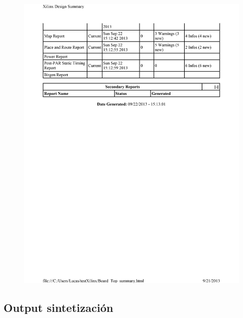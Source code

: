 \documentclass{article}
\begin{document}
\begin{figure}[h!]
  \centering
	\includegraphics[scale=0.7]{Board_Top_summary-2.png}\\[1cm] 
\end{figure}
\subsection{Output sintetización}
\end{document}
